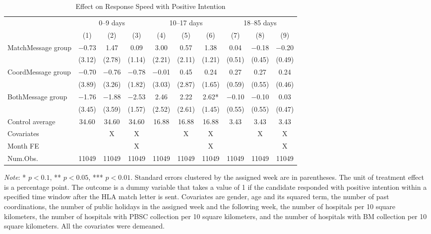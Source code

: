 \documentclass[12pt, a4paper]{article}
\begin{document}
\begin{table}
\centering\centering
\caption{\label{tab:lm-positive-time-decompose}Effect on Response Speed with Positive Intention}
\centering
\fontsize{8}{10}\selectfont
\begin{threeparttable}
\begin{tabular}[t]{lccccccccc}
\toprule
\multicolumn{1}{c}{ } & \multicolumn{3}{c}{0--9 days} & \multicolumn{3}{c}{10--17 days} & \multicolumn{3}{c}{18--85 days} \\
\cmidrule(l{3pt}r{3pt}){2-4} \cmidrule(l{3pt}r{3pt}){5-7} \cmidrule(l{3pt}r{3pt}){8-10}
  & (1) & (2) & (3) & (4) & (5) & (6) & (7) & (8) & (9)\\
\midrule
MatchMessage group & \num{-0.73} & \num{1.47} & \num{0.09} & \num{3.00} & \num{0.57} & \num{1.38} & \num{0.04} & \num{-0.18} & \num{-0.20}\\
 & (\num{3.12}) & (\num{2.78}) & (\num{1.14}) & (\num{2.21}) & (\num{2.11}) & (\num{1.21}) & (\num{0.51}) & (\num{0.45}) & (\num{0.49})\\
CoordMessage group & \num{-0.70} & \num{-0.76} & \num{-0.78} & \num{-0.01} & \num{0.45} & \num{0.24} & \num{0.27} & \num{0.27} & \num{0.24}\\
 & (\num{3.89}) & (\num{3.26}) & (\num{1.82}) & (\num{3.03}) & (\num{2.87}) & (\num{1.65}) & (\num{0.59}) & (\num{0.55}) & (\num{0.46})\\
BothMessage group & \num{-1.76} & \num{-1.88} & \num{-2.53} & \num{2.46} & \num{2.22} & \num{2.62}* & \num{-0.10} & \num{-0.10} & \num{0.03}\\
 & (\num{3.45}) & (\num{3.59}) & (\num{1.57}) & (\num{2.52}) & (\num{2.61}) & (\num{1.45}) & (\num{0.55}) & (\num{0.55}) & (\num{0.47})\\
\midrule
Control average & 34.60 & 34.60 & 34.60 & 16.88 & 16.88 & 16.88 & 3.43 & 3.43 & 3.43\\
Covariates &  & X & X &  & X & X &  & X & X\\
Month FE &  &  & X &  &  & X &  &  & X\\
Num.Obs. & \num{11049} & \num{11049} & \num{11049} & \num{11049} & \num{11049} & \num{11049} & \num{11049} & \num{11049} & \num{11049}\\
\bottomrule
\end{tabular}
\begin{tablenotes}
\item \emph{Note}: * $p < 0.1$, ** $p < 0.05$, *** $p < 0.01$. Standard errors clustered by the assigned week are in parentheses. The unit of treatment effect is a percentage point. The outcome is a dummy variable that takes a value of 1 if the candidate responded with positive intention within a specified time window after the HLA match letter is sent. Covariates are gender, age and its squared term, the number of past coordinations, the number of public holidays in the assigned week and the following week, the number of hospitals per 10 square kilometers, the number of hospitals with PBSC collection per 10 square kilometers, and the number of hospitals with BM collection per 10 square kilometers. All the covariates were demeaned.
\end{tablenotes}
\end{threeparttable}
\end{table}
\end{document}
